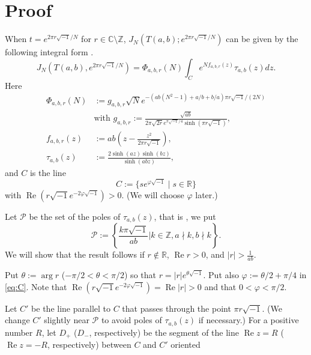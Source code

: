 \documentclass[a4paper,draft]{amsart}
\theoremstyle{plain}
\theoremstyle{definition}
\theoremstyle{remark}
\newcommand{\Z}{\mathbb{Z}}
\newcommand{\C}{\mathbb{C}}
\newcommand{\R}{\mathbb{R}}
\renewcommand{\Re}{\operatorname{Re}}
\numberwithin{equation}{section}
\begin{document}
\section{Proof}
When $t=e^{2\pi{r}\sqrt{-1}/N}$ for $r\in\C\setminus{\Z}$,
$J_N\left(T(a,b);e^{2\pi{r}\sqrt{-1}/N}\right)$ can be given by the following
integral form \cite[Lemma~1]{Kashaev/Tirkkonen:ZAPNS200}.
\begin{equation*}
  J_N\left(T(a,b),e^{2\pi{r}\sqrt{-1}/N}\right)
  =
  \Phi_{a,b,r}(N)
  \int_{C}
  e^{Nf_{a,b,r}(z)}
  \tau_{a,b}(z)
  dz.
\end{equation*}
Here
\begin{align*}
  \Phi_{a,b,r}(N)
  &:=g_{a,b,r}\sqrt{N}
     e^{-\left(ab\left(N^2-1\right)+a/b+b/a\right)\pi{r}\sqrt{-1}/(2N)}
  \\
  &\text{
    with
      $g_{a,b,r}
       :=
       \frac{\sqrt{ab}}
            {2\pi\sqrt{2r}
            e^{\pi\sqrt{-1}/4}\sinh\left(\pi{r}\sqrt{-1}\right)}$},
  \\[3mm]
  f_{a,b,r}(z)
  &:=
  ab\left(z-\frac{z^2}{2\pi{r}\sqrt{-1}}\right),
  \\[3mm]
  \tau_{a,b}(z)
  &:=
  \frac{2\sinh(az)\sinh(bz)}{\sinh(abz)},
\end{align*}
and $C$ is the line
\begin{equation}\label{eq:C}
  C:=\{se^{\varphi\sqrt{-1}}\mid{s}\in\R\}
\end{equation}
with $\Re\left(r\sqrt{-1}e^{-2\varphi\sqrt{-1}}\right)>0$.
(We will choose $\varphi$ later.)
\par
Let $\mathcal{P}$ be the set of the poles of $\tau_{a,b}(z)$, that is , we put
\begin{equation*}
  \mathcal{P}
  :=
  \left\{\frac{k\pi\sqrt{-1}}{ab} \big| k\in\Z,a\nmid k,b\nmid k\right\}.
\end{equation*}
We will show that the result follows if $r\notin\R$, $\Re{r}>0$,
and $|r|>\frac{1}{ab}$.
\par
Put $\theta:=\arg{r}$ ($-\pi/2<\theta<\pi/2$) so that
$r=|r|e^{\theta\sqrt{-1}}$.
Put also $\varphi:=\theta/2+\pi/4$ in \eqref{eq:C}.
Note that $\Re\left(r\sqrt{-1}e^{-2\varphi\sqrt{-1}}\right)=\Re|r|>0$
and that $0<\varphi<\pi/2$.
\par
Let ${C'}$ be the line parallel to $C$ that passes through the point
$\pi{r}\sqrt{-1}$.
(We change $C'$ slightly near $\mathcal{P}$ to avoid poles of $\tau_{a,b}(z)$
if necessary.)
For a positive number $R$, let $D_{+}$ ($D_{-}$, respectively) be the segment of
the line $\Re{z}=R$ ($\Re{z}=-R$, respectively) between $C$ and $C'$ oriented
\end{document}
